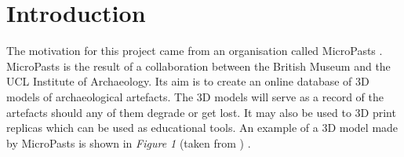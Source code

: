 \documentclass[12pt]{IIBproject}
\begin{document}
\begin{abstract}
In terms of the reconstructions they produced, the automatically generated masks were able to match the hand labelled versions. This was achieved using an order of magnitude less human input.


\end{abstract}
\newpage
\pagestyle{plain}
\tableofcontents
\newpage














\section{Introduction}

The motivation for this project came from an organisation called MicroPasts \cite{micropasts}. MicroPasts is the result of a collaboration between the British Museum and the UCL Institute of Archaeology. Its aim is to create an online database of 3D models of archaeological artefacts. The 3D models will serve as a record of the artefacts should any of them degrade or get lost. It may also be used to 3D print replicas which can be used as educational tools. An example of a 3D model made by MicroPasts is shown in \emph{Figure 1} (taken from \cite{jugModel}) .
\end{document}

